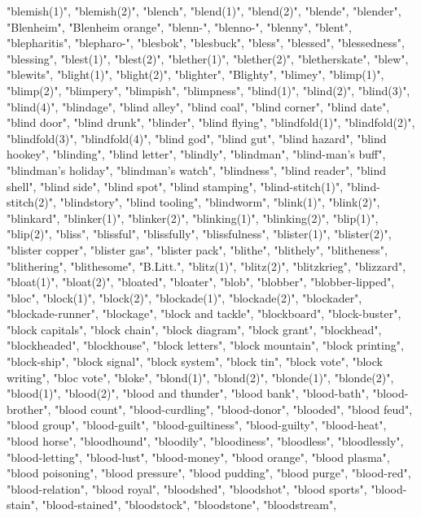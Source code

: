 "blemish(1)",
"blemish(2)",
"blench",
"blend(1)",
"blend(2)",
"blende",
"blender",
"Blenheim",
"Blenheim orange",
"blenn-",
"blenno-",
"blenny",
"blent",
"blepharitis",
"blepharo-",
"blesbok",
"blesbuck",
"bless",
"blessed",
"blessedness",
"blessing",
"blest(1)",
"blest(2)",
"blether(1)",
"blether(2)",
"bletherskate",
"blew",
"blewits",
"blight(1)",
"blight(2)",
"blighter",
"Blighty",
"blimey",
"blimp(1)",
"blimp(2)",
"blimpery",
"blimpish",
"blimpness",
"blind(1)",
"blind(2)",
"blind(3)",
"blind(4)",
"blindage",
"blind alley",
"blind coal",
"blind corner",
"blind date",
"blind door",
"blind drunk",
"blinder",
"blind flying",
"blindfold(1)",
"blindfold(2)",
"blindfold(3)",
"blindfold(4)",
"blind god",
"blind gut",
"blind hazard",
"blind hookey",
"blinding",
"blind letter",
"blindly",
"blindman",
"blind-man's buff",
"blindman's holiday",
"blindman's watch",
"blindness",
"blind reader",
"blind shell",
"blind side",
"blind spot",
"blind stamping",
"blind-stitch(1)",
"blind-stitch(2)",
"blindstory",
"blind tooling",
"blindworm",
"blink(1)",
"blink(2)",
"blinkard",
"blinker(1)",
"blinker(2)",
"blinking(1)",
"blinking(2)",
"blip(1)",
"blip(2)",
"bliss",
"blissful",
"blissfully",
"blissfulness",
"blister(1)",
"blister(2)",
"blister copper",
"blister gas",
"blister pack",
"blithe",
"blithely",
"blitheness",
"blithering",
"blithesome",
"B.Litt.",
"blitz(1)",
"blitz(2)",
"blitzkrieg",
"blizzard",
"bloat(1)",
"bloat(2)",
"bloated",
"bloater",
"blob",
"blobber",
"blobber-lipped",
"bloc",
"block(1)",
"block(2)",
"blockade(1)",
"blockade(2)",
"blockader",
"blockade-runner",
"blockage",
"block and tackle",
"blockboard",
"block-buster",
"block capitals",
"block chain",
"block diagram",
"block grant",
"blockhead",
"blockheaded",
"blockhouse",
"block letters",
"block mountain",
"block printing",
"block-ship",
"block signal",
"block system",
"block tin",
"block vote",
"block writing",
"bloc vote",
"bloke",
"blond(1)",
"blond(2)",
"blonde(1)",
"blonde(2)",
"blood(1)",
"blood(2)",
"blood and thunder",
"blood bank",
"blood-bath",
"blood-brother",
"blood count",
"blood-curdling",
"blood-donor",
"blooded",
"blood feud",
"blood group",
"blood-guilt",
"blood-guiltiness",
"blood-guilty",
"blood-heat",
"blood horse",
"bloodhound",
"bloodily",
"bloodiness",
"bloodless",
"bloodlessly",
"blood-letting",
"blood-lust",
"blood-money",
"blood orange",
"blood plasma",
"blood poisoning",
"blood pressure",
"blood pudding",
"blood purge",
"blood-red",
"blood-relation",
"blood royal",
"bloodshed",
"bloodshot",
"blood sports",
"blood-stain",
"blood-stained",
"bloodstock",
"bloodstone",
"bloodstream",
